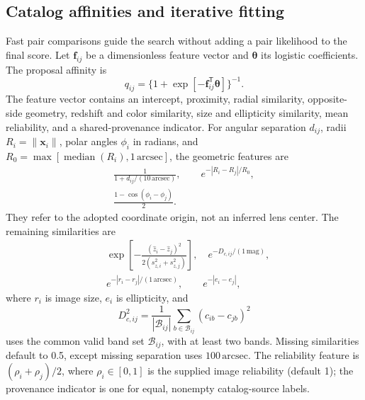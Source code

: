 \documentclass[twocolumn,twocolappendix,linenumbers]{aastex701}
\begin{document}
\subsection{Catalog affinities and iterative fitting}
Fast pair comparisons guide the search without adding a pair likelihood to the final score.
Let $\boldsymbol f_{ij}$ be a dimensionless feature vector and $\boldsymbol\theta$ its logistic coefficients.
The proposal affinity is
\begin{equation}
 q_{ij}=\{1+\exp[-\boldsymbol f_{ij}^{\mathsf T}
                              \boldsymbol\theta]\}^{-1}.
 \label{eq:logistic}
\end{equation}
The feature vector contains an intercept, proximity, radial similarity, opposite-side geometry, redshift and color similarity, size and ellipticity similarity, mean reliability, and a shared-provenance indicator.
For angular separation $d_{ij}$, radii $R_i=\|\boldsymbol x_i\|$, polar angles $\phi_i$ in radians, and $R_0=\max[\operatorname{median}(R_i),1\,\mathrm{arcsec}]$, the geometric features are
\begin{equation}
 \begin{gathered}
 \frac{1}{1+d_{ij}/(10\,\mathrm{arcsec})},\qquad
 e^{-|R_i-R_j|/R_0},\\
 \frac{1-\cos(\phi_i-\phi_j)}{2}.
 \end{gathered}
 \label{eq:geofeatures}
\end{equation}
They refer to the adopted coordinate origin, not an inferred lens center.
The remaining similarities are
\begin{equation}
 \begin{aligned}
 &\exp\!\left[-\frac{(\hat z_i-\hat z_j)^2}
                         {2(s_{z,i}^2+s_{z,j}^2)}\right],\quad
   e^{-D_{c,ij}/(1\,\mathrm{mag})},\\
 &e^{-|r_i-r_j|/(1\,\mathrm{arcsec})},\qquad
   e^{-|e_i-e_j|},
 \end{aligned}
 \label{eq:similarities}
\end{equation}
where $r_i$ is image size, $e_i$ is ellipticity, and
\begin{equation}
 D_{c,ij}^2=\frac{1}{|\mathcal B_{ij}|}
       \sum_{b\in\mathcal B_{ij}}(c_{ib}-c_{jb})^2
 \label{eq:colordistance}
\end{equation}
uses the common valid band set $\mathcal B_{ij}$, with at least two bands.
Missing similarities default to 0.5, except missing separation uses $100\,\mathrm{arcsec}$.
The reliability feature is $(\rho_i+\rho_j)/2$, where $\rho_i\in[0,1]$ is the supplied image reliability (default 1); the provenance indicator is one for equal, nonempty catalog-source labels.
\end{document}
